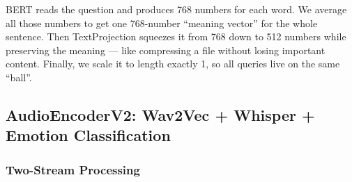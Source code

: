 \documentclass[12pt,a4paper]{article}
\theoremstyle{definition}
\theoremstyle{plain}
\theoremstyle{remark}
\begin{document}
\begin{tcolorbox}[laymanbox]
BERT reads the question and produces 768 numbers for each word.
We average all those numbers to get one 768-number ``meaning vector'' for the
whole sentence. Then TextProjection squeezes it from 768 down to 512 numbers while
preserving the meaning — like compressing a file without losing important content.
Finally, we scale it to length exactly 1, so all queries live on the same ``ball''.
\end{tcolorbox}

\subsection{AudioEncoderV2: Wav2Vec + Whisper + Emotion Classification}

\subsubsection{Two-Stream Processing}
\end{document}
